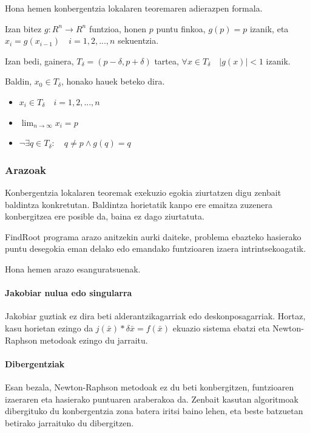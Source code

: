 \documentclass[10pt,a4paper,basque]{article}
\begin{document}
Hona hemen konbergentzia lokalaren teoremaren adierazpen formala.

Izan bitez $g:R^n \rightarrow R^n$ funtzioa, honen $p$ puntu finkoa, $g(p) = p$ izanik, eta $x_i = g(x_{i-1}) \quad i = 1, 2, ..., n$ sekuentzia.

Izan bedi, gainera, $T_{\delta} = (p - \delta, p + \delta)$ tartea, $\forall x \in T_{\delta} \quad |g(x)| < 1$ izanik.

Baldin, $x_0 \in T_{\delta}$, honako hauek beteko dira.

\begin{itemize}
\item $x_i \in T_{\delta} \quad i = 1, 2, ..., n$
\item $\lim_{n \rightarrow \infty} x_i = p$
\item $\neg\exists q \in T_{\delta} : \quad q \neq p \wedge g(q) = q$
\end{itemize}

\subsubsection{Arazoak}

Konbergentzia lokalaren teoremak exekuzio egokia ziurtatzen digu zenbait baldintza konkretutan. Baldintza horietatik kanpo ere emaitza zuzenera konbergitzea ere posible da, baina ez dago ziurtatuta.

FindRoot programa arazo anitzekin aurki daiteke, problema ebazteko hasierako puntu desegokia eman delako edo emandako funtzioaren izaera intrintsekoagatik.

Hona hemen arazo esanguratsuenak.

\paragraph{Jakobiar nulua edo singularra}

Jakobiar guztiak ez dira beti alderantzikagarriak edo deskonposagarriak. Hortaz, kasu horietan ezingo da $j(\bar{x}) * \delta \bar{x} = f(\bar{x})$ ekuazio sistema ebatzi eta Newton-Raphson metodoak ezingo du jarraitu.

\paragraph{Dibergentziak}

Esan bezala, Newton-Raphson metodoak ez du beti konbergitzen, funtzioaren izaeraren eta hasierako puntuaren araberakoa da. Zenbait kasutan algoritmoak dibergituko du konbergentzia zona batera iritsi baino lehen, eta beste batzuetan betirako jarraituko du dibergitzen.
\end{document}

